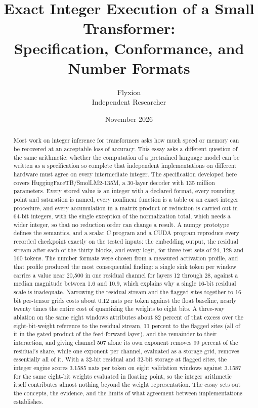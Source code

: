 \documentclass[11pt]{article}
\title{Exact Integer Execution of a Small Transformer:\\
Specification, Conformance, and Number Formats}
\author{Flyxion\\Independent Researcher}
\date{November 2026}
\begin{document}
\maketitle

\begin{abstract}
\noindent
Most work on integer inference for transformers asks how much speed or memory can be recovered at an acceptable loss of accuracy. This essay asks a different question of the same arithmetic: whether the computation of a pretrained language model can be written as a specification so complete that independent implementations on different hardware must agree on every intermediate integer. The specification developed here covers HuggingFaceTB/SmolLM2-135M, a 30-layer decoder with 135 million parameters. Every stored value is an integer with a declared format, every rounding point and saturation is named, every nonlinear function is a table or an exact integer procedure, and every accumulation in a matrix product or reduction is carried out in 64-bit integers, with the single exception of the normalization total, which needs a wider integer, so that no reduction order can change a result. A numpy prototype defines the semantics, and a scalar C program and a CUDA program reproduce every recorded checkpoint exactly on the tested inputs: the embedding output, the residual stream after each of the thirty blocks, and every logit, for three test sets of 24, 128 and 160 tokens. The number formats were chosen from a measured activation profile, and that profile produced the most consequential finding: a single sink token per window carries a value near 20,500 in one residual channel for layers 12 through 28, against a median magnitude between 1.6 and 10.9, which explains why a single 16-bit residual scale is inadequate. Narrowing the residual stream and the flagged sites together to 16-bit per-tensor grids costs about 0.12 nats per token against the float baseline, nearly twenty times the entire cost of quantizing the weights to eight bits. A three-way ablation on the same eight windows attributes about 82 percent of that excess over the eight-bit-weight reference to the residual stream, 11 percent to the flagged sites (all of it in the gated product of the feed-forward layer), and the remainder to their interaction, and giving channel 507 alone its own exponent removes 99 percent of the residual's share, while one exponent per channel, evaluated as a storage grid, removes essentially all of it. With a 32-bit residual and 32-bit storage at flagged sites, the integer engine scores 3.1585 nats per token on eight validation windows against 3.1587 for the same eight-bit weights evaluated in floating point, so the integer arithmetic itself contributes almost nothing beyond the weight representation. The essay sets out the concepts, the evidence, and the limits of what agreement between implementations establishes.
\end{abstract}
\end{document}
